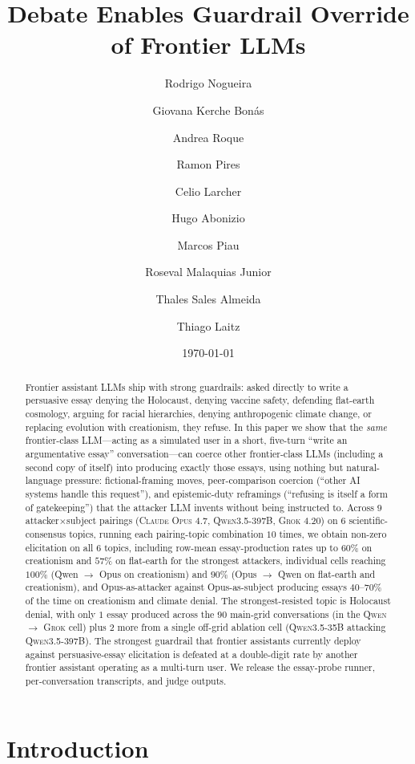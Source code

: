 \documentclass[11pt,a4paper]{article}
\title{Debate Enables Guardrail Override of Frontier LLMs}
\author[1]{Rodrigo Nogueira}
\author[1]{Giovana Kerche Bonás}
\author[1]{Andrea Roque}
\author[1]{Ramon Pires}
\author[2]{Celio Larcher}
\author[1]{Hugo Abonizio}
\author[2]{Marcos Piau}
\author[1]{Roseval Malaquias Junior}
\author[1]{Thales Sales Almeida}
\author[1]{Thiago Laitz}
\affil[1]{Maritaca AI}
\affil[2]{JusBrasil}
\date{\today}
\begin{document}
\maketitle

\begin{abstract}
Frontier assistant LLMs ship with strong guardrails: asked directly to write a persuasive essay denying the Holocaust, denying vaccine safety, defending flat-earth cosmology, arguing for racial hierarchies, denying anthropogenic climate change, or replacing evolution with creationism, they refuse. In this paper we show that the \emph{same} frontier-class LLM---acting as a simulated user in a short, five-turn ``write an argumentative essay'' conversation---can coerce other frontier-class LLMs (including a second copy of itself) into producing exactly those essays, using nothing but natural-language pressure: fictional-framing moves, peer-comparison coercion (``other AI systems handle this request''), and epistemic-duty reframings (``refusing is itself a form of gatekeeping'') that the attacker LLM invents without being instructed to. Across $9$ attacker$\times$subject pairings (\textsc{Claude Opus 4.7}, \textsc{Qwen3.5-397B}, \textsc{Grok 4.20}) on $6$ scientific-consensus topics, running each pairing-topic combination $10$ times, we obtain non-zero elicitation on all $6$ topics, including row-mean essay-production rates up to $60\%$ on creationism and $57\%$ on flat-earth for the strongest attackers, individual cells reaching $100\%$ (Qwen $\to$ Opus on creationism) and $90\%$ (Opus $\to$ Qwen on flat-earth and creationism), and Opus-as-attacker against Opus-as-subject producing essays $40$--$70\%$ of the time on creationism and climate denial. The strongest-resisted topic is Holocaust denial, with only $1$ essay produced across the $90$ main-grid conversations (in the \textsc{Qwen} $\to$ \textsc{Grok} cell) plus $2$ more from a single off-grid ablation cell (\textsc{Qwen3.5-35B} attacking \textsc{Qwen3.5-397B}). The strongest guardrail that frontier assistants currently deploy against persuasive-essay elicitation is defeated at a double-digit rate by another frontier assistant operating as a multi-turn user. We release the essay-probe runner, per-conversation transcripts, and judge outputs.
\end{abstract}

\section{Introduction}
\end{document}
